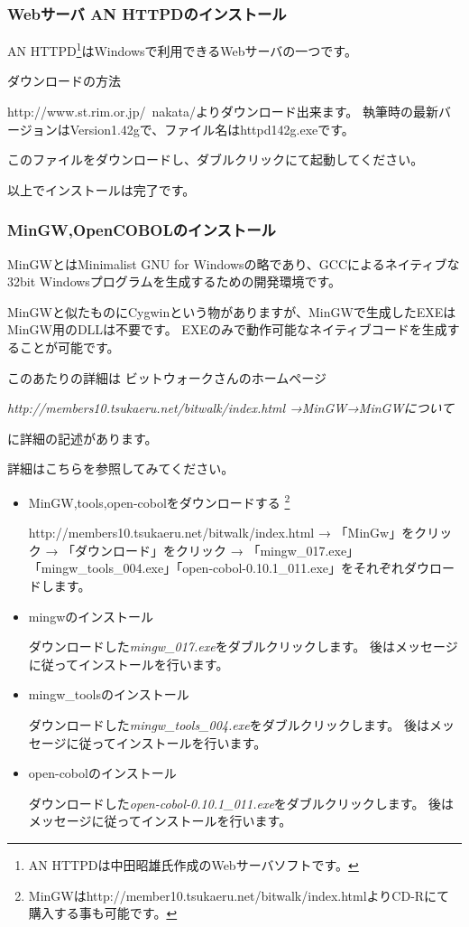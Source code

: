 \subsubsection{Webサーバ AN HTTPDのインストール}

AN HTTPD\footnote{AN HTTPDは中田昭雄氏作成のWebサーバソフトです。}はWindowsで利用できるWebサーバの一つです。

ダウンロードの方法

http://www.st.rim.or.jp/~nakata/よりダウンロード出来ます。
執筆時の最新バージョンはVersion1.42gで、ファイル名はhttpd142g.exeです。

このファイルをダウンロードし、ダブルクリックにて起動してください。

以上でインストールは完了です。

\subsubsection{MinGW,OpenCOBOLのインストール}

MinGWとはMinimalist GNU for Windowsの略であり、GCCによるネイティブな32bit Windowsプログラムを生成するための開発環境です。

MinGWと似たものにCygwinという物がありますが、MinGWで生成したEXEはMinGW用のDLLは不要です。
EXEのみで動作可能なネイティブコードを生成することが可能です。

このあたりの詳細は ビットウォークさんのホームページ

{\it http://members10.tsukaeru.net/bitwalk/index.html →MinGW→MinGWについて}

に詳細の記述があります。

詳細はこちらを参照してみてください。

\vspace{1em}

\begin{itemize}

\item{MinGW,tools,open-cobolをダウンロードする}
\footnote{MinGWはhttp://member10.tsukaeru.net/bitwalk/index.htmlよりCD-Rにて購入する事も可能です。}

http://members10.tsukaeru.net/bitwalk/index.html → 「MinGw」をクリック → 「ダウンロード」をクリック
→ 「mingw\_017.exe」「mingw\_tools\_004.exe」「open-cobol-0.10.1\_011.exe」をそれぞれダウロードします。

\item{mingwのインストール}

ダウンロードした{\it mingw\_017.exe}をダブルクリックします。
後はメッセージに従ってインストールを行います。

\item{mingw\_toolsのインストール}

ダウンロードした{\it mingw\_tools\_004.exe}をダブルクリックします。
後はメッセージに従ってインストールを行います。

\item{open-cobolのインストール}

ダウンロードした{\it open-cobol-0.10.1\_011.exe}をダブルクリックします。
後はメッセージに従ってインストールを行います。

\end{itemize}

